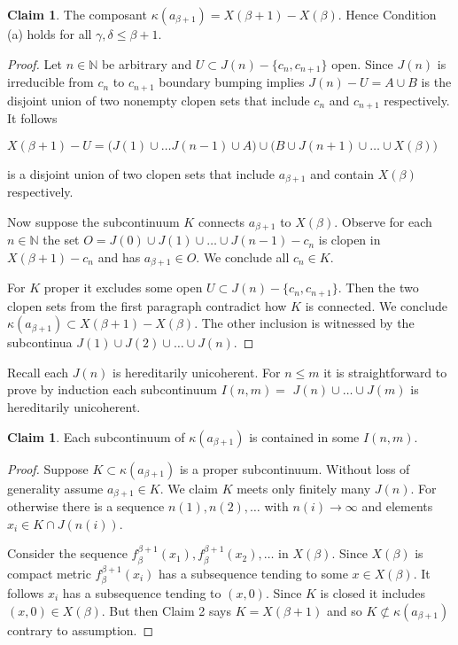 \documentclass[12pt]{article}
\theoremstyle{plain}
\theoremstyle{definition}
\newcounter{claim5counter}
\newtheorem{claim5}[claim5counter]{Claim}
\newcommand{\K}{\ensuremath{\kappa}}
\newcommand{\B}{\ensuremath{\beta}}
\newcommand{\G}{\ensuremath{\gamma}}
\newcommand{\D}{\ensuremath{\delta}}
\newcommand{\NN}{\ensuremath{\mathbb N}}
\newcommand{\0}{\ensuremath{\varnothing}}
\begin{document}
	
	\begin{claim5}\label{5succ(a)}
		The composant $\K(a_{\B+1}) = X(\B+1)-X(\B)$.  Hence Condition (a) holds for all $\G,\D \le \B+1$.
	\end{claim5}
	
	\begin{proof}Let $n \in \NN$ be arbitrary and $U \subset J(n) - \{c_{n},c_{n+1}\}$ open.
		Since $J(n)$ is irreducible from $c_{n}$ to $c_{n+1}$ 
		boundary bumping implies $J(n) - U = A \cup B$ is the disjoint union of two nonempty clopen sets
		that include $c_{n}$ and $c_{n+1}$ respectively.
		It follows
		
		\begin{center}
			$X(\B+1)-U = \big (J(1) \cup \ldots J(n-1) \cup A \big ) \cup \big (B \cup J(n+1) \cup \ldots \cup X(\B) \big)$
		\end{center}
		
		is a disjoint union of two clopen sets that include $a_{\B+1}$ and contain $X(\B)$ respectively.
		
		Now suppose the subcontinuum $K$ connects $a_{\B+1}$ to $X(\B)$. 
		Observe for each $n \in \NN$ the set $O = J(0) \cup J(1) \cup \ldots \cup J(n-1) - c_n$ is clopen in $X(\B+1) - c_n$
		and has $a_{\B+1} \in O$.
		We conclude all $c_n \in K$.
		
		
		For $K$ proper it excludes some open $U \subset J(n) - \{c_{n},c_{n+1}\}$.
		Then the two clopen sets from the first paragraph contradict how $K$ is connected.
		We conclude $\K(a_{\B+1})  \subset X(\B+1)-X(\B)$.
		The other inclusion is witnessed by the subcontinua $J(1) \cup J(2) \cup \ldots \cup J(n)$.
	\end{proof}
	
	
	Recall each $J(n)$ is hereditarily unicoherent.
	For $n \le m$ it is straightforward to prove by induction each subcontinuum $I(n,m) = $ $J(n) \cup \ldots \cup J(m)$ is hereditarily unicoherent.
	
	
	\begin{claim5}
		Each subcontinuum of $\K(a_{\B+1})$ is contained in some $I(n,m)$.
	\end{claim5}
	
	\begin{proof}
		Suppose $K \subset \K(a_{\B+1})$ is a proper subcontinuum.
		Without loss of generality assume $a_{\B+1} \in K$.
		We claim $K$ meets only finitely many $J(n)$.
		For otherwise there is a sequence $n(1),n(2),\ldots$ with $n(i) \to \infty$ and elements $x_i \in K \cap J(n(i))$.
		
		Consider the sequence $f^{\B+1}_\B(x_1), f^{\B+1}_\B(x_2), \ldots$ in $X(\B)$.
		Since $X(\B)$ is compact metric $f^{\B+1}_\B(x_i)$ has a subsequence tending to some $x \in X(\B)$.
		It follows $x_i$ has a subsequence tending to $(x,0)$.
		Since $K$ is closed it includes $(x,0) \in X(\B)$.
		But then Claim 2 says $K = X(\B+1)$ and so $K \not \subset \K(a_{\B+1})$ contrary to assumption.
	\end{proof}
	
\end{document}
